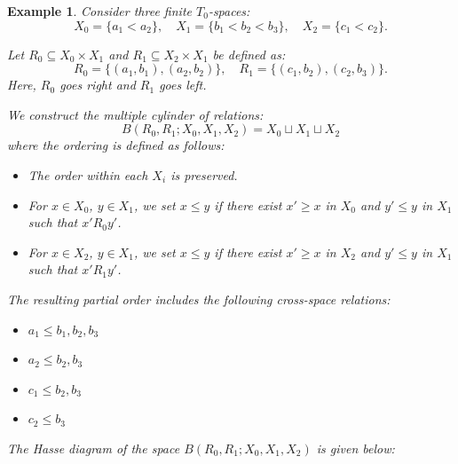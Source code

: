 \documentclass[12pt,a4paper,twoside, reqno, tbtags]{article}
\numberwithin{equation}{section}
\newtheorem{example}{Example}[section]
\begin{document}
\begin{example}
Consider three finite $T_0$-spaces:
\[
X_0 = \{a_1 < a_2\}, \quad X_1 = \{b_1 < b_2 < b_3\}, \quad X_2 = \{c_1 < c_2\}.
\]

Let \( R_0 \subseteq X_0 \times X_1 \) and \( R_1 \subseteq X_2 \times X_1 \) be defined as:
\[
R_0 = \{(a_1, b_1), (a_2, b_2)\}, \quad R_1 = \{(c_1, b_2), (c_2, b_3)\}.
\]
Here, \( R_0 \) goes right and \( R_1 \) goes left.

We construct the multiple cylinder of relations:
\[
B(R_0, R_1; X_0, X_1, X_2) = X_0 \sqcup X_1 \sqcup X_2
\]
where the ordering is defined as follows:
\begin{itemize}
    \item The order within each \( X_i \) is preserved.
    \item For \( x \in X_0 \), \( y \in X_1 \), we set \( x \leq y \) if there exist \( x' \geq x \) in \( X_0 \) and \( y' \leq y \) in \( X_1 \) such that \( x' R_0 y' \).
    \item For \( x \in X_2 \), \( y \in X_1 \), we set \( x \leq y \) if there exist \( x' \geq x \) in \( X_2 \) and \( y' \leq y \) in \( X_1 \) such that \( x' R_1 y' \).
\end{itemize}

The resulting partial order includes the following cross-space relations:
\begin{itemize}
    \item \( a_1 \leq b_1, b_2, b_3 \)
    \item \( a_2 \leq b_2, b_3 \)
    \item \( c_1 \leq b_2, b_3 \)
    \item \( c_2 \leq b_3 \)
\end{itemize}

\vspace{1em}
\noindent The Hasse diagram of the space \( B(R_0, R_1; X_0, X_1, X_2) \) is given below:

\begin{center}
\end{center}
\end{example}
\end{document}
